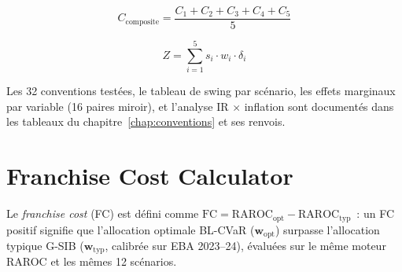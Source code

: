 \documentclass[10pt, a4paper, oneside]{report}
\theoremstyle{definition}
\begin{document}
\begin{equation}
C_{\text{composite}} = \frac{C_1 + C_2 + C_3 + C_4 + C_5}{5}
\label{eq:composite}
\end{equation}

\begin{equation}
Z = \sum_{i=1}^{5} s_i \cdot w_i \cdot \delta_i
\label{eq:z-lineaire}
\end{equation}

Les 32 conventions testées, le tableau de swing par scénario, les effets marginaux par variable (16 paires miroir), et l'analyse IR $\times$ inflation sont documentés dans les tableaux du chapitre~\ref{chap:conventions} et ses renvois.


\section{Franchise Cost Calculator}
\label{sec:annexe:franchise}

Le \emph{franchise cost} (FC) est défini comme $\text{FC} = \text{RAROC}_{\text{opt}} - \text{RAROC}_{\text{typ}}$~: un FC positif signifie que l'allocation optimale BL-CVaR ($\mathbf{w}_{\text{opt}}$) surpasse l'allocation typique G-SIB ($\mathbf{w}_{\text{typ}}$, calibrée sur EBA 2023--24), évaluées sur le même moteur RAROC et les mêmes 12 scénarios.
\end{document}
